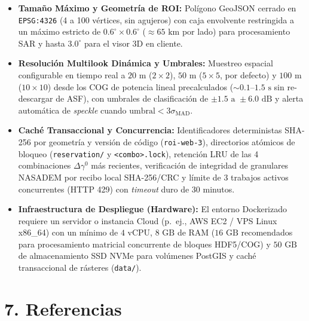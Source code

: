 \documentclass[11pt,a4paper]{article}
\begin{document}
\begin{itemize}

    \item \textbf{Tama\~no M\'aximo y Geometr\'ia de ROI:} Pol\'igono GeoJSON cerrado en \texttt{EPSG:4326} (4 a 100 v\'ertices, sin agujeros) con caja envolvente restringida a un m\'aximo estricto de $0.6^\circ \times 0.6^\circ$ ($\approx 65\text{ km}$ por lado) para procesamiento SAR y hasta $3.0^\circ$ para el visor 3D en cliente.

    \item \textbf{Resoluci\'on Multilook Din\'amica y Umbrales:} Muestreo espacial configurable en tiempo real a $20\text{ m}$ ($2 \times 2$), $50\text{ m}$ ($5 \times 5$, por defecto) y $100\text{ m}$ ($10 \times 10$) desde los COG de potencia lineal precalculados ($\sim 0.1\text{--}1.5\text{ s}$ sin re-descargar de ASF), con umbrales de clasificaci\'on de $\pm 1.5\text{ a }\pm 6.0\text{ dB}$ y alerta autom\'atica de \emph{speckle} cuando $\text{umbral} < 3\sigma_{\text{MAD}}$.

    \item \textbf{Cach\'e Transaccional y Concurrencia:} Identificadores deterministas SHA-256 por geometr\'ia y versi\'on de c\'odigo (\texttt{roi-web-3}), directorios at\'omicos de bloqueo (\texttt{reservation/} y \texttt{<combo>.lock}), retenci\'on LRU de las 4 combinaciones $\Delta\gamma^0$ m\'as recientes, verificaci\'on de integridad de granulares NASADEM por recibo local SHA-256/CRC y l\'imite de 3 trabajos activos concurrentes (HTTP 429) con \emph{timeout} duro de 30 minutos.

    \item \textbf{Infraestructura de Despliegue (Hardware):} El entorno Dockerizado requiere un servidor o instancia Cloud (p.~ej., AWS EC2 / VPS Linux x86\_64) con un m\'inimo de $4\text{ vCPU}$, $8\text{ GB}$ de RAM ($16\text{ GB}$ recomendados para procesamiento matricial concurrente de bloques HDF5/COG) y $50\text{ GB}$ de almacenamiento SSD NVMe para vol\'umenes PostGIS y cach\'e transaccional de r\'asteres (\texttt{data/}).

\end{itemize}

\section*{7. Referencias}
\end{document}
